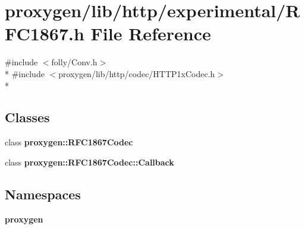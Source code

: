 \section{proxygen/lib/http/experimental/\+R\+F\+C1867.h File Reference}
\label{RFC1867_8h}
{\ttfamily \#include $<$folly/\+Conv.\+h$>$}\\*
{\ttfamily \#include $<$proxygen/lib/http/codec/\+H\+T\+T\+P1x\+Codec.\+h$>$}\\*
\subsection*{Classes}
\begin{DoxyCompactItemize}
\item 
class {\bf proxygen\+::\+R\+F\+C1867\+Codec}
\item 
class {\bf proxygen\+::\+R\+F\+C1867\+Codec\+::\+Callback}
\end{DoxyCompactItemize}
\subsection*{Namespaces}
\begin{DoxyCompactItemize}
\item 
 {\bf proxygen}
\end{DoxyCompactItemize}
